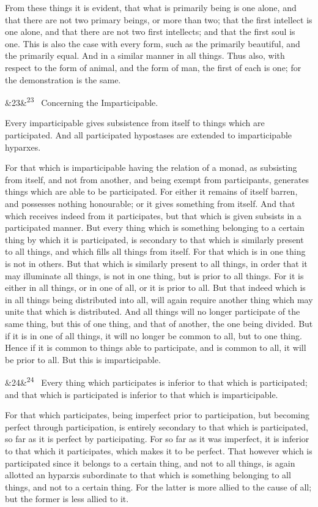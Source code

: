 \documentclass[12pt]{article}
\newcommand{\para}[1][]{\par\noindent\ifx&#1&\else\textsuperscript{\footnotesize #1}~\fi}
\begin{document}
From these things it is evident, that what is primarily being is one alone, and that there are not two primary beings, or more than two; that the first intellect is one alone, and that there are not two first intellects; and that the first soul is one. This is also the case with every form, such as the primarily beautiful, and the primarily equal. And in a similar manner in all things. Thus also, with respect to the form of animal, and the form of man, the first of each is one; for the demonstration is the same.

\para[23] Concerning the Imparticipable.

Every imparticipable gives subsistence from itself to things which are participated. And all participated hypostases are extended to imparticipable hyparxes.

For that which is imparticipable having the relation of a monad, as subsisting from itself, and not from another, and being exempt from participants, generates things which are able to be participated. For either it remains of itself barren, and possesses nothing honourable; or it gives something from itself. And that which receives indeed from it participates, but that which is given subsists in a participated manner. But every thing which is something belonging to a certain thing by which it is participated, is secondary to that which is similarly present to all things, and which fills all things from itself. For that which is in one thing is not in others. But that which is similarly present to all things, in order that it may illuminate all things, is not in one thing, but is prior to all things. For it is either in all things, or in one of all, or it is prior to all. But that indeed which is in all things being distributed into all, will again require another thing which may unite that which is distributed. And all things will no longer participate of the same thing, but this of one thing, and that of another, the one being divided. But if it is in one of all things, it will no longer be common to all, but to one thing. Hence if it is common to things able to participate, and is common to all, it will be prior to all. But this is imparticipable.

\para[24] Every thing which participates is inferior to that which is participated; and that which is participated is inferior to that which is imparticipable.

For that which participates, being imperfect prior to participation, but becoming perfect through participation, is entirely secondary to that which is participated, so far as it is perfect by participating. For so far as it was imperfect, it is inferior to that which it participates, which makes it to be perfect. That however which is participated since it belongs to a certain thing, and not to all things, is again allotted an hyparxis subordinate to that which is something belonging to all things, and not to a certain thing. For the latter is more allied to the cause of all; but the former is less allied to it.
\end{document}
